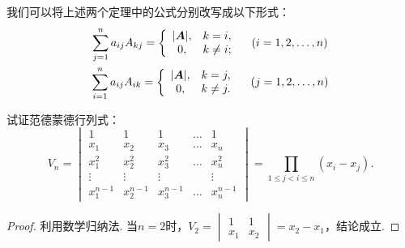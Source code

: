 我们可以将上述两个定理中的公式分别改写成以下形式：
\begin{gather}
	\sum\limits_{j=1}^n a_{ij} A_{kj} = \left\{ \begin{array}{cl}
		\abs{\A}, & k = i, \\
		0, & k \neq i;
	\end{array} \right.
	\quad(i=1,2,\dotsc,n) \\%
	\sum\limits_{i=1}^n a_{ij} A_{ik} = \left\{ \begin{array}{cl}
		\abs{\A}, & k = j, \\
		0, & k \neq j.
	\end{array} \right.
	\quad(j=1,2,\dotsc,n)
\end{gather}

\begin{example}
试证范德蒙德行列式：
\begin{equation}\label{equation:行列式.范德蒙德行列式}
V_n = \begin{vmatrix}
1 & 1 & 1 & \dots & 1 \\
x_1 & x_2 & x_3 & \dots & x_n \\
x_1^2 & x_2^2 & x_3^2 & \dots & x_n^2 \\
\vdots & \vdots & \vdots& & \vdots \\
x_1^{n-1} & x_2^{n-1} & x_3^{n-1} & \dots & x_n^{n-1}
\end{vmatrix}=\prod\limits_{1 \leqslant j < i \leqslant n}(x_i-x_j).
\end{equation}
\begin{proof}
利用数学归纳法.
当\(n=2\)时，\(V_2 = \begin{vmatrix}
	1 & 1 \\ x_1 & x_2
\end{vmatrix} = x_2 - x_1\)，结论成立.


\end{proof}
\end{example}
